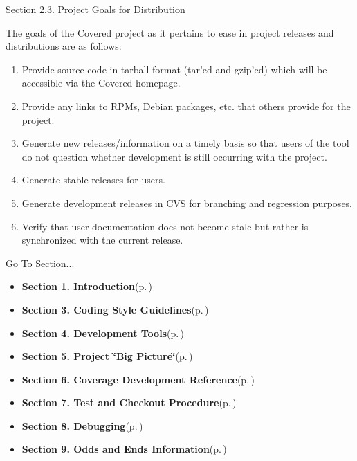\begin{Desc}
\item[Section 2.3. Project Goals for Distribution]\end{Desc}
\begin{Desc}
\item[]The goals of the Covered project as it pertains to ease in project releases and distributions are as follows:\end{Desc}
\begin{Desc}
\item[]\begin{enumerate}
\item Provide source code in tarball format (tar'ed and gzip'ed) which will be accessible via the Covered homepage.\item Provide any links to RPMs, Debian packages, etc. that others provide for the project.\item Generate new releases/information on a timely basis so that users of the tool do not question whether development is still occurring with the project.\item Generate stable releases for users.\item Generate development releases in CVS for branching and regression purposes.\item Verify that user documentation does not become stale but rather is synchronized with the current release.\end{enumerate}
\end{Desc}




\begin{Desc}
\item[Go To Section...]\begin{itemize}
\item {\bf Section 1.  Introduction}{\rm (p.\,\pageref{page_intro})}\item {\bf Section 3.  Coding Style Guidelines}{\rm (p.\,\pageref{page_code_style})}\item {\bf Section 4.  Development Tools}{\rm (p.\,\pageref{page_tools})}\item {\bf Section 5.  Project \char`\"{}Big Picture\char`\"{}}{\rm (p.\,\pageref{page_big_picture})}\item {\bf Section 6.  Coverage Development Reference}{\rm (p.\,\pageref{page_code_details})}\item {\bf Section 7.  Test and Checkout Procedure}{\rm (p.\,\pageref{page_testing})}\item {\bf Section 8.  Debugging}{\rm (p.\,\pageref{page_debugging})}\item {\bf Section 9.  Odds and Ends Information}{\rm (p.\,\pageref{page_misc})} \end{itemize}
\end{Desc}
